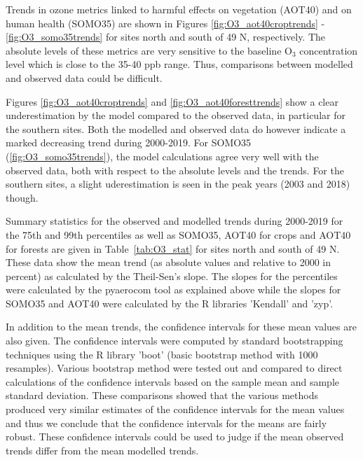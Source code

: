 Trends in ozone metrics linked to harmful effects on vegetation (AOT40) and on human health (SOMO35) are shown in Figures \ref{fig:O3_aot40croptrends} - \ref{fig:O3_somo35trends} for sites north and south of 49 \degrees N, respectively. The absolute levels of these metrics are very sensitive to the baseline O$_3$ concentration level which is close to the 35-40 ppb range. Thus, comparisons between modelled and observed data could be difficult. 

Figures \ref{fig:O3_aot40croptrends} and \ref{fig:O3_aot40foresttrends} show a clear underestimation by the model compared to the observed data, in particular for the southern sites. Both the modelled and observed data do however indicate a marked decreasing trend during 2000-2019. For SOMO35 (\ref{fig:O3_somo35trends}), the model calculations agree very well with the observed data, both with respect to the absolute levels and the trends. For the southern sites, a slight uderestimation is seen in the peak years (2003 and 2018) though. 

Summary statistics for the observed and modelled trends during 2000-2019 for the 75th and 99th percentiles as well as SOMO35, AOT40 for crops and AOT40 for forests are given in Table~\ref{tab:O3_stat} for sites north and south of 49 \degrees N. These data show the mean trend (as absolute values and relative to 2000 in percent) as calculated by the Theil-Sen's slope. The slopes for the percentiles were calculated by the pyaerocom tool as explained above while the slopes for SOMO35 and AOT40 were calculated by the R libraries 'Kendall' and 'zyp'. 

In addition to the mean trends, the confidence intervals for these mean values are also given. The confidence intervals were computed by standard bootstrapping techniques \citep{DavisonHinkley:1997} using the R library 'boot' (basic bootstrap method with 1000 resamples). Various bootstrap method were tested out and compared to direct calculations of the confidence intervals based on the sample mean and sample standard deviation. These comparisons showed that the various methods produced very similar estimates of the confidence intervals for the mean values and thus we conclude that the confidence intervals for the means are fairly robust. These confidence intervals could be used to judge if the mean observed trends differ from the mean modelled trends.



